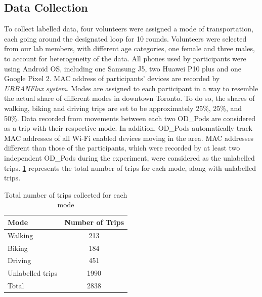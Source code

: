 \subsection{Data Collection}
To collect labelled data, four volunteers were assigned a mode of transportation, each going around the designated loop for 10 rounds. Volunteers were selected from our lab members, with different age categories, one female and three males, to account for heterogeneity of the data. All phones used by participants were using Android OS, including one Samsung J5, two Huawei P10 plus and one Google Pixel 2. MAC address of participants' devices are recorded by \emph{URBANFlux system}. Modes are assigned to each participant in a way to resemble the actual share of different modes in downtown Toronto. To do so, the shares of walking, biking and driving trips are set to be approximately 25\%, 25\%, and 50\%. Data recorded from movements between each two OD\_Pods are considered as a trip with their respective mode. In addition, OD\_Pods automatically track MAC addresses of all Wi-Fi enabled devices moving in the area. MAC addresses different than those of the participants, which were recorded by at least two independent OD\_Pods during the experiment, were considered as the unlabelled trips. \cref{tab:Total} represents the total number of trips for each mode, along with unlabelled trips.

\begin{table}
\centering
\label{tab:Tripsum}
\caption{Total number of trips collected for each mode}
\begin{tabular}{|l|c|}
\hline
    {\textbf{Mode}} & {\textbf{Number of Trips}} \\
\hline
\hline
{Walking} & 213  \\
{Biking} &        184     \\
{Driving} &        451     \\
{Unlabelled trips} &        1990     \\
\hline
\hline
Total & 2838\\
\hline
\end{tabular}
\label{tab:Total}
\end{table}



